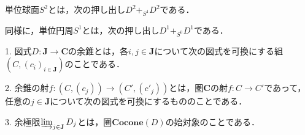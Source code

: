 \documentclass[uplatex, 12pt, dvipdfmx]{jsarticle}
\begin{document}
\vspace{3cm}

\begin{example}[Topでの押し出し]
    単位球面$S^2$とは，次の押し出し$D^2+_{S^1}D^2$である．
    \begin{center}
    \end{center}
    同様に，単位円周$S^1$とは，次の押し出し$D^1+_{S^0}D^1$である．
    \begin{center}
    \end{center}
\end{example}

\vspace{3cm}

\begin{definition*}[Colimits]
    1. 図式$D:\mathbf{J}\to \mathbf{C}$の余錐とは，各$i,j\in\mathbf{J}$について次の図式を可換にする組$(C,(c_i)_{i\in\mathbf{J}})$のことである．
    \begin{center}
    \end{center}
    
    2. 余錐の射$f:(C,(c_j))\to (C',(c'_j))$とは，圏$\mathbf{C}$の射$f:C\to C'$であって，任意の$j\in\mathbf{J}$について次の図式を可換にするもののことである．
    \begin{center}
    \end{center}

    3. 余極限$\varinjlim_{j\in\mathbf{J}}D_j$とは，圏$\mathbf{Cocone}(D)$の始対象のことである．
\end{definition*}
\end{document}
